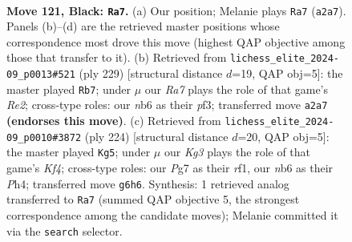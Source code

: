 \documentclass[11pt]{article}
\begin{document}
\begin{figure}[p]\centering
\begin{subfigure}{0.46\textwidth}\centering
\resizebox{\linewidth}{!}{%
\newchessgame
\chessboard[
  setfen={8/6p1/1N4k1/4Rp1p/7P/6PK/r7/8 b - - 1 121},
  showmover=false,
  pgfstyle=straightmove, color=movearrow, markmove={a2-a7}
]}
\caption{}
\end{subfigure}\hfill
\begin{subfigure}{0.46\textwidth}\centering
\resizebox{\linewidth}{!}{%
\newchessgame
\chessboard[
  setfen={8/4r3/6pk/7p/R6P/5PP1/5K2/8 b - - 40 115},
  showmover=false,
  pgfstyle=straightmove, color=movearrow, markmove={e7-b7}
]}
\caption{}
\end{subfigure}
\\[4pt]
\begin{subfigure}{0.46\textwidth}\centering
\resizebox{\linewidth}{!}{%
\newchessgame
\chessboard[
  setfen={8/2R2pk1/6p1/4P3/5KPP/8/8/5r2 w - - 7 113},
  showmover=false,
  pgfstyle=straightmove, color=movearrow, markmove={f4-g5}
]}
\caption{}
\end{subfigure}\hfill

\caption{\textbf{Move 121, Black: \texttt{Ra7}.} (a) Our position; Melanie plays \texttt{Ra7} (\texttt{a2a7}). Panels (b)--(d) are the retrieved master positions whose correspondence most drove this move (highest QAP objective among those that transfer to it). (b) Retrieved from \texttt{lichess\_elite\_2024-09\_p0013\#521} (ply 229) [structural distance $d$=19, QAP obj=5]: the master played \texttt{Rb7}; under $\mu$ our \emph{Ra7} plays the role of that game's \emph{Re2}; cross-type roles: our \emph{n}b6 as their \emph{p}f3; transferred move \texttt{a2a7} \textbf{(endorses this move)}. (c) Retrieved from \texttt{lichess\_elite\_2024-09\_p0010\#3872} (ply 224) [structural distance $d$=20, QAP obj=5]: the master played \texttt{Kg5}; under $\mu$ our \emph{Kg3} plays the role of that game's \emph{Kf4}; cross-type roles: our \emph{P}g7 as their \emph{r}f1, our \emph{n}b6 as their \emph{P}h4; transferred move \texttt{g6h6}. Synthesis: 1 retrieved analog transferred to \texttt{Ra7} (summed QAP objective 5, the strongest correspondence among the candidate moves); Melanie committed it via the \texttt{search} selector.}
\label{fig:thought-m241}
\end{figure}
\end{document}

